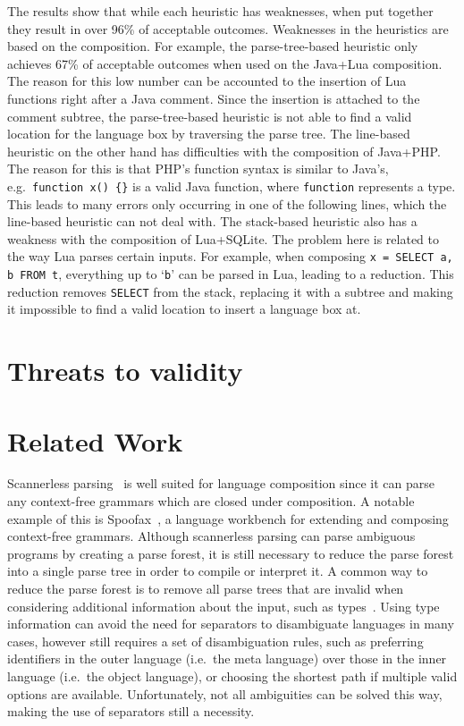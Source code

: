 \documentclass[sigplan,screen]{acmart}\settopmatter{printfolios=true,printccs=false,printacmref=false}
\begin{document}
The results show that while each heuristic has weaknesses, when put together
they result in over 96\% of acceptable outcomes. Weaknesses in the heuristics
are based on the composition. For example, the parse-tree-based heuristic only
achieves 67\% of acceptable outcomes when used on the Java+Lua composition. The
reason for this low number can be accounted to the insertion of Lua functions
right after a Java comment.  Since the insertion is attached to the comment
subtree, the parse-tree-based heuristic is not able to find a valid location for
the language box by traversing the parse tree.  The line-based heuristic on the
other hand has difficulties with the composition of Java+PHP. The reason for
this is that PHP's function syntax is similar to Java's, e.g.~\texttt{function
x() \{\}} is a valid Java function, where \texttt{function} represents a type.
This leads to many errors only occurring in one of the following lines, which
the line-based heuristic can not deal with. The stack-based heuristic also has
a weakness with the composition of Lua+SQLite. The problem here is related to
the way Lua parses certain inputs. For example, when composing \texttt{x =
SELECT a, b FROM t}, everything up to `\texttt{b}' can be parsed in Lua,
leading to a reduction. This reduction removes \texttt{SELECT} from the stack,
replacing it with a subtree and making it impossible to find a valid location
to insert a language box at.


\section{Threats to validity}


\section{Related Work}
\label{autobox_related_work}

Scannerless parsing~\cite{visser97scannerless, vandenbrand02disambiguation} is well
suited for language composition since it can parse any context-free grammars
which are closed under composition. A notable example of this is
Spoofax~\cite{kats10spoofax}, a language workbench for extending and composing
context-free grammars.
Although scannerless parsing can parse ambiguous programs by creating a parse
forest, it is still necessary to reduce the parse forest into a single
parse tree in order to compile or interpret it. A common way to reduce the parse forest is to
remove all parse trees that are invalid when considering additional information
about the input, such as types~\cite{vinju05typedriven}. Using type information can avoid the
need for separators to disambiguate languages in many cases, however still
requires a set of disambiguation rules, such as preferring identifiers in the
outer language (i.e.~the meta language) over those in the inner language
(i.e.~the object language), or choosing the shortest path if multiple valid
options are available. Unfortunately, not all ambiguities can be solved this
way, making the use of separators still a necessity.
\end{document}
